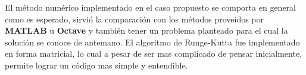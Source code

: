 
El método numérico implementado en el caso propuesto se comporta en general como es esperado, sirvió la comparación con los métodos proveídos por \textbf{MATLAB} u \textbf{Octave} y también tener un problema planteado para el cual la solución se conoce de antemano. El algoritmo de Runge-Kutta fue implementado en forma matricial, lo cual a pesar de ser mas complicado de pensar inicialmente, permite lograr un código mas simple y entendible.